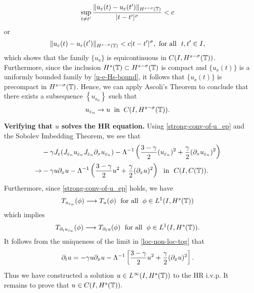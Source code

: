 %
%
%
\begin{equation*}
\label{equic-1}
\sup_{t \neq t'} \frac { \|u_\varepsilon(t) - u_\varepsilon(t') \|_{H^{s -
\sigma}(\mathbb{T})}}{|t - t'|^\sigma} < c 
\end{equation*}
%
%
%
or
%
%
%
\begin{equation*}
\label{equic-2}
\|u_\varepsilon(t) - u_\varepsilon(t') \|_{H^{s - \sigma}(\mathbb{T})}< c|t - t'|^\sigma, \text{ 
for all }  \,\,  t, t'\in I,
\end{equation*}
%
%
%
%
which shows that the family  $\{u_\ee\}$ is equicontinuous in $C(I, 
H^{s-\sigma}(\mathbb{T}))$. Furthermore, since the inclusion $H^s(\mathbb{T}) \subset H^{s-
\sigma }(\mathbb{T})$ is compact and 
$\{u_\ee(t)\}$ is a uniformly bounded family by 
\eqref{u-e-Hs-bound}, it follows that
$\{u_\ee(t)\}$ is precompact in 
$H^{s-\sigma}(\mathbb{T})$. Hence, we can apply Ascoli's Theorem  
\cite{Dieudonne_1969_Foundations-of-} to conclude that there exists a 
subsequence $\left\{ u_{\ee_n} \right\}$
such that
%
%
\begin{equation}
\label{strong-conv-of-u_ep}
u_{\varepsilon_n} \to u \; \; \text{in} \; \; C(I, H^{s-\sigma}(\mathbb{T})).
\end{equation}
%
%
%
%
%
%
%
%
%

\textbf{Verifying that $u$ solves the HR equation.} Using 
\eqref{strong-conv-of-u_ep}
and the Sobolev Imbedding Theorem, we see that
%
%
%
%
\begin{equation}
\begin{split}
& -\gamma J_\varepsilon (J_{\varepsilon_n} u_{\varepsilon_n}  J_{\varepsilon_n} \partial_x
u_{\varepsilon_n}) - \Lambda^{-1} \left( \frac{3-\gamma}{2}
(u_{\varepsilon_n})^2
+ \frac{\gamma}{2} (\partial_x u_{\varepsilon_n})^2 \right )
\\
\to & -\gamma u \partial_x u -
\Lambda^{-1} \left( \frac{3-\gamma}{2} u^2
+ \frac{\gamma}{2} (\partial_x u)^2 \right ) \ \
\text{in} \ \ C(I, C(\mathbb{T})).
\label{loc-non-loc-tog}
\end{split}
\end{equation}
%
%
Furthermore, since \eqref{strong-conv-of-u_ep} holds, we have
%
%
%
\begin{equation}
\label{weak-conv-2}
T_{u_{\varepsilon_n}}(\phi)  \longrightarrow  T_u(\phi) \;
\text{ for all } \;  \phi \in L^1(I, H^{s}(\mathbb{T}))
\end{equation}
%
%
%
which implies
%
%
%
%
\begin{equation}
\label{distib-conv-2}
T_{\partial_t u_{\varepsilon_n}}(\phi)  \longrightarrow  T_{\partial_t u}(\phi) \;
\text{ for all } \;  \phi \in L^1(I, H^{s}(\mathbb{T})).
\end{equation}
%
%
%
%
It follows from the uniqueness of the limit in \eqref{loc-non-loc-tog}
that
%
%
%
\begin{equation}
\label{1000y}
\partial_t u =- \gamma u \partial_x u- \Lambda^{-1} \left
[\frac{3-\gamma}{2}u^2 + \frac{\gamma}{2}(\partial_x u)^2 \right ].
\end{equation}
%
%
%
Thus we have constructed a solution $u \in L^\infty(I, H^s(\mathbb{T}))$
to the HR i.v.p. It remains to prove that $u \in C(I, H^s(\mathbb{T})).$
%
%
%
%
%


